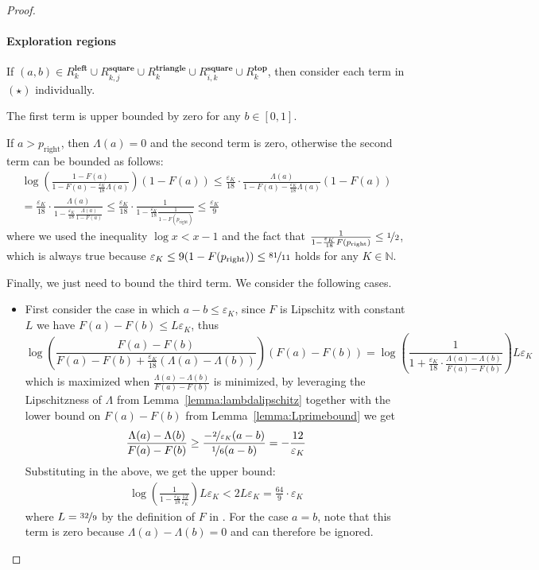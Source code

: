 \documentclass[final,12pt]{colt2025}
\newcommand{\e}{\varepsilon}
\newcommand{\lrb}[1]{\left(#1\right)}
\newcommand{\nb}{b}
\newcommand{\ns}{a}
\begin{document}
\begin{proof}
\paragraph{Exploration regions}
If $(\ns,\nb) \in R^{\textbf{left}}_k \cup R^{\textbf{square}}_{k,j} \cup R^{\textbf{triangle}}_{k} \cup R^{\textbf{square}}_{i,k} \cup R^{\textbf{top}}_{k}$, then consider each term in $(\star)$ individually. 

The first term is upper bounded by zero for any $b \in [0, 1]$. 

If $\ns > p_\text{right}$, then $\Lambda(\ns) = 0$ and the second term is zero, otherwise the second term can be bounded as follows:
\begin{multline*}
    \log \lrb{ \frac{1 - F(\ns)}{1 - F(\ns) - \frac{\e_K}{18}\Lambda(\ns)} } (1 - F(\ns))
    \le \frac{\e_K}{18} \cdot \frac{\Lambda(\ns)}{1-F(\ns)-\frac{\e_K}{18}\Lambda(\ns)}(1-F(\ns))
    \\
    = \frac{\e_K}{18} \cdot \frac{\Lambda(\ns)}{1-\frac{\e_K}{18}\frac{\Lambda(\ns)}{1-F(\ns)}}
    \leq \frac{\e_K}{18} \cdot \frac{1}{1-\frac{\e_K}{18}\frac{1}{1-F(p_\text{right})}}
    \leq \frac{\e_K}{9}
\end{multline*}
where we used the inequality $\log x < x-1$ and the fact that $\frac{1}{1-\frac{\e_K}{18}F(p_\text{right})} \leq \nicefrac{1}{2}$, which is always true because $\e_K \leq 9(1-F(p_\text{right})) \le \nicefrac{81}{11}$ holds for any $K \in \mathbb{N}$. 

Finally, we just need to bound the third term. We consider the following cases.
\begin{itemize}
    \item  First consider the case in which $\ns - \nb \leq \e_K$, since $F$ is Lipschitz with constant $L$ we have $F(\ns) - F(\nb) \leq L\e_K$, thus
    \[
        \log\lrb{ \frac{F(\ns) - F(\nb)}{F(\ns) - F(\nb) + \frac{\e_K}{18}(\Lambda(\ns)-\Lambda(\nb))}} (F(\ns) - F(\nb))
        = \log\lrb{ \frac{1}{1+\frac{\e_K}{18}\cdot\frac{\Lambda(\ns)-\Lambda(\nb)}{F(\ns)-F(\nb)}}} L\e_K
    \]
    which is maximized when $\frac{\Lambda(\ns)-\Lambda(\nb)}{F(\ns)-F(\nb)}$ is minimized, by leveraging the Lipschitzness of $\Lambda$ from Lemma~\ref{lemma:lambdalipschitz} together with the lower bound on $F(\ns) - F(\nb)$ from Lemma~\ref{lemma:Lprimebound} we get
    \[
        \frac{\Lambda(\ns) - \Lambda(\nb)}{F(\ns) - F(\nb)}
        \ge
        \frac{- \nicefrac{2}{\e_K} (\ns - \nb)}{\nicefrac{1}{6} (\ns - \nb)}
        = - \frac{12}{\e_K}
    \]
    Substituting in the above, we get the upper bound:
    \begin{align*}
        \log \lrb{
            \frac{1}{1 - \frac{\e_K}{18} \frac{12}{\e_K}}
        } L\e_K
        < 2 L \e_K
        = \frac{64}{9}\cdot\e_K
    \end{align*}
    where $L = \nicefrac{32}{9}$ by the definition of $F$ in . For the case $\ns = \nb$, note that this term is zero because $\Lambda(\ns) - \Lambda(\nb) = 0$ and can therefore be ignored.


\end{itemize}
\end{proof}
\end{document}
